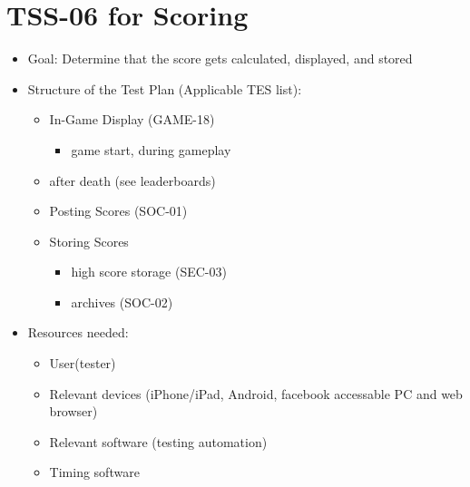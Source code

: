 \section{TSS-06 for Scoring}
\begin{itemize}
\item Goal: Determine that the score gets calculated, displayed, and stored

\item Structure of the Test Plan (Applicable TES list):
\begin{itemize}
\item In-Game Display (GAME-18)
\begin{itemize}
\item game start, during gameplay
\end{itemize}

\item after death (see leaderboards)
\item Posting Scores (SOC-01)

\item Storing Scores
\begin{itemize}
\item high score storage (SEC-03)
\item archives (SOC-02)
\end{itemize}
\end{itemize}

\item Resources needed:
\begin{itemize}
\item User(tester)
\item Relevant devices (iPhone/iPad, Android, facebook accessable PC and web browser)
\item Relevant software (testing automation)
\item Timing software
\end{itemize}
\end{itemize}


